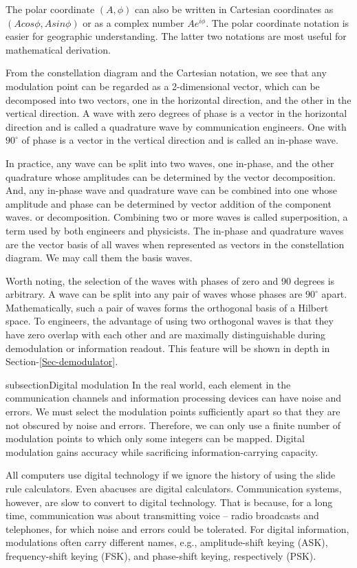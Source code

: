 \documentclass[oneside, letter, 12pt]{book}
\begin{document}
The polar coordinate $(A, \phi)$ can also be written in Cartesian coordinates as $(A cos\phi, A sin\phi)$ or as a complex number $A e^{i\phi}$. The polar coordinate notation is easier for geographic understanding. The latter two notations are most useful for mathematical derivation.

From the constellation diagram and the Cartesian notation, we see that any modulation point can be regarded as a 2-dimensional vector, which can be decomposed into two vectors, one in the horizontal direction, and the other in the vertical direction. A wave with zero degrees of phase is a vector in the horizontal direction and is called a quadrature wave by communication engineers. One with $90^\circ$ of phase is a vector in the vertical direction and is called an in-phase wave.

In practice, any wave can be split into two waves, one in-phase, and the other quadrature whose amplitudes can be determined by the vector decomposition. And, any in-phase wave and quadrature wave can be combined into one whose amplitude and phase can be determined by vector addition of the component waves. or decomposition. Combining two or more waves is called superposition, a term used by both engineers and physicists. The in-phase and quadrature waves are the vector basis of all waves when represented as vectors in the constellation diagram. We may call them the basis waves.

Worth noting, the selection of the waves with phases of zero and 90 degrees is arbitrary. A wave can be split into any pair of waves whose phases are $90^\circ$ apart. Mathematically, such a pair of waves forms the orthogonal basis of a Hilbert space. To engineers, the advantage of using two orthogonal waves is that they have zero overlap with each other and are maximally distinguishable during demodulation or information readout. This feature will be shown in depth in Section-\ref{Sec-demodulator}.

subsection{Digital modulation}
In the real world, each element in the communication channels and information processing devices can have noise and errors. We must select the modulation points sufficiently apart so that they are not obscured by noise and errors. Therefore, we can only use a finite number of modulation points to which only some integers can be mapped. Digital modulation gains accuracy while sacrificing information-carrying capacity.

All computers use digital technology if we ignore the history of using the slide rule calculators. Even abacuses are digital calculators. Communication systems, however, are slow to convert to digital technology. That is because, for a long time, communication was about transmitting voice -- radio broadcasts and telephones, for which noise and errors could be tolerated. For digital information, modulations often carry different names, e.g., amplitude-shift keying (ASK), frequency-shift keying (FSK), and phase-shift keying, respectively (PSK).
\end{document}
